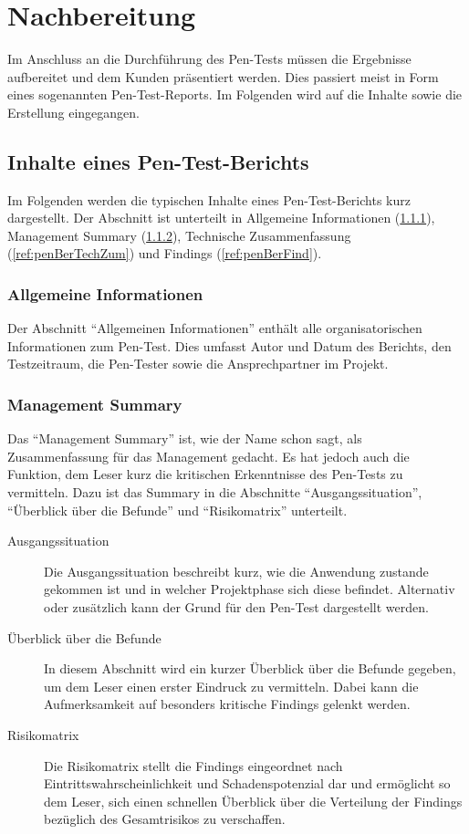 \newpage
\section{Nachbereitung}
Im Anschluss an die Durchführung des Pen-Tests müssen die Ergebnisse aufbereitet und dem Kunden präsentiert werden. Dies passiert meist in Form eines sogenannten Pen-Test-Reports. Im Folgenden wird auf die Inhalte sowie die Erstellung eingegangen.

	\subsection{Inhalte eines Pen-Test-Berichts}
	Im Folgenden werden die typischen Inhalte eines Pen-Test-Berichts kurz dargestellt. Der Abschnitt ist unterteilt in Allgemeine Informationen (\ref{ref:penBerAllgInf}), Management Summary (\ref{ref:penBerMgmtSum}), Technische Zusammenfassung (\ref{ref:penBerTechZum}) und Findings (\ref{ref:penBerFind}).
	
	\subsubsection{Allgemeine Informationen}\label{ref:penBerAllgInf}
		Der Abschnitt "`Allgemeinen Informationen"' enthält alle organisatorischen Informationen zum Pen-Test. Dies umfasst Autor und Datum des Berichts, den Testzeitraum, die Pen-Tester sowie die  Ansprechpartner im Projekt.
		
	\subsubsection{Management Summary}\label{ref:penBerMgmtSum}
	Das "`Management Summary"' ist, wie der Name schon sagt, als Zusammenfassung für das Management gedacht. Es hat jedoch auch die Funktion, dem Leser kurz die kritischen Erkenntnisse des Pen-Tests zu vermitteln. Dazu ist das Summary in die Abschnitte "`Ausgangssituation"', "`Überblick über die Befunde"' und "`Risikomatrix"' unterteilt.
	
	\begin{description}
		\item[Ausgangssituation] Die Ausgangssituation beschreibt kurz, wie die Anwendung zustande gekommen ist und in welcher Projektphase sich diese befindet. Alternativ oder zusätzlich kann der Grund für den Pen-Test dargestellt werden. 
		
		\item[Überblick über die Befunde] In diesem Abschnitt wird ein kurzer Überblick über die Befunde gegeben, um dem Leser einen erster Eindruck zu vermitteln. Dabei kann die Aufmerksamkeit auf besonders kritische Findings gelenkt werden.
		
		\item[Risikomatrix] Die Risikomatrix stellt die Findings eingeordnet nach Eintrittswahrscheinlichkeit und Schadenspotenzial dar und ermöglicht so dem Leser, sich einen schnellen Überblick über die Verteilung der Findings bezüglich des Gesamtrisikos zu verschaffen.
	\end{description}
		
